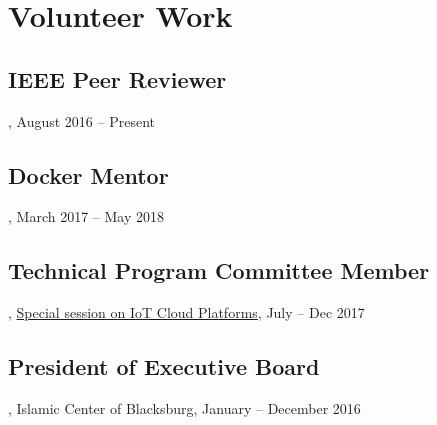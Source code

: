\section{Volunteer Work}
\subsection{IEEE Peer Reviewer}, August 2016 -- Present
\subsection{Docker Mentor}, March 2017 -- May 2018
\subsection{Technical Program Committee Member}, \href{https://computing.derby.ac.uk/c/special-session-on-iot-cloud-platforms}{Special session on IoT Cloud Platforms}, July -- Dec 2017
\subsection{President of Executive Board}, Islamic Center of Blacksburg, January -- December 2016
